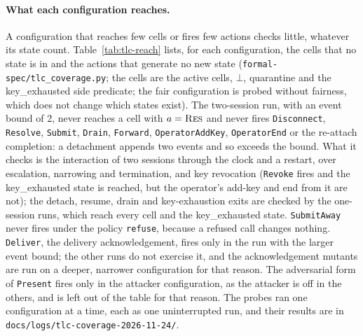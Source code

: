 \paragraph{What each configuration reaches.} A configuration that
reaches few cells or fires few actions checks little, whatever its state
count. Table~\ref{tab:tlc-reach} lists, for each configuration, the cells
that no state is in and the actions that generate no new state
(\texttt{formal-spec/tlc\_coverage.py}; the cells are the active cells,
$\bot$, quarantine and the key\_exhausted side predicate; the fair configuration is probed without fairness,
which does not change which states exist). The two-session run, with an event bound of 2,
never reaches a cell with $a=\textsc{Res}$ and never fires
\texttt{Disconnect}, \texttt{Resolve}, \texttt{Submit}, \texttt{Drain},
\texttt{Forward}, \texttt{OperatorAddKey}, \texttt{OperatorEnd} or the
re-attach completion: a detachment appends two
events and so exceeds the bound. What it checks is the interaction of two
sessions through the clock and a restart, over escalation, narrowing and
termination, and key revocation (\texttt{Revoke} fires and the key\_exhausted
state is reached, but the operator's add-key and end from it are not); the
detach, resume, drain and key-exhaustion exits are checked by the one-session
runs, which reach every cell and the key\_exhausted state. \texttt{SubmitAway} never fires under the policy
\texttt{refuse}, because a refused call changes nothing. \texttt{Deliver},
the delivery acknowledgement, fires only in the run with the larger event
bound; the other runs do not exercise it, and the acknowledgement mutants
are run on a deeper, narrower configuration for that reason. The adversarial
form of \texttt{Present} fires only in the attacker configuration, as the
attacker is off in the others, and is left out of the table for that reason.
The probes ran one configuration at a time, each as one uninterrupted run, and
their results are in \texttt{docs/logs/tlc-coverage-2026-11-24/}.

